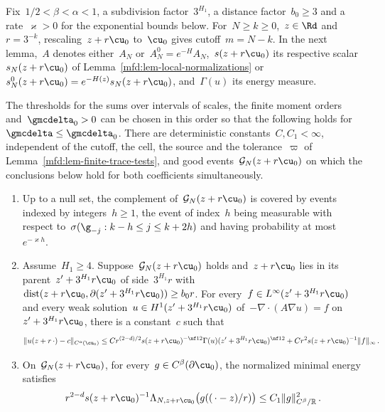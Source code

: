 \documentclass[11pt]{amsart}
\begin{document}
Fix~$1/2<\beta<\alpha<1$, a subdivision factor~$3^{H_1}$, a distance factor~$b_0\geq3$ and a rate~$\varkappa>0$ for the exponential bounds below. For~$N\geq k\geq0$,~$z\in\Rd$ and~$r=3^{-k}$, rescaling~$z+r\cu_0$ to~$\cu_0$ gives cutoff~$m=N-k$. In the next lemma,~$A$ denotes either~$A_N$ or~$A_N^0=e^{-H}A_N$,~$s(z+r\cu_0)$ its respective scalar~$s_N(z+r\cu_0)$ of Lemma~\ref{mfd:lem-local-normalizations} or~$s_N^0(z+r\cu_0)=e^{-H(z)}s_N(z+r\cu_0)$, and~$\Gamma(u)$ its energy measure.

\begin{lemma}
\label{mfd:lem-finite-good-cell}
The thresholds for the sums over intervals of scales, the finite moment orders and~$\gmcdelta_0>0$ can be chosen in this order so that the following holds for~$\gmcdelta\leq\gmcdelta_0$. There are deterministic constants~$C,C_1<\infty$, independent of the cutoff, the cell, the source and the tolerance~$\varpi$ of Lemma~\ref{mfd:lem-finite-trace-tests}, and good events~$\mathcal G_N(z+r\cu_0)$ on which the conclusions below hold for both coefficients simultaneously.
\begin{enumerate}[label=(\roman*),leftmargin=*]
\item Up to a null set, the complement of~$\mathcal G_N(z+r\cu_0)$ is covered by events indexed by integers~$h\geq1$, the event of index~$h$ being measurable with respect to~$\sigma(\g_{-j}:k-h\leq j\leq k+2h)$ and having probability at most~$e^{-\varkappa h}$.
\item Assume~$H_1\geq4$. Suppose~$\mathcal G_N(z+r\cu_0)$ holds and~$z+r\cu_0$ lies in its parent~$z'+3^{H_1}r\cu_0$ of side~$3^{H_1}r$ with~$\operatorname{dist}(z+r\cu_0,\partial(z'+3^{H_1}r\cu_0))\geq b_0r$. For every~$f\in L^\infty(z'+3^{H_1}r\cu_0)$ and every weak solution~$u\in H^1(z'+3^{H_1}r\cu_0)$ of~$-\nabla\cdot(A\nabla u)=f$ on~$z'+3^{H_1}r\cu_0$, there is a constant~$c$ such that
\begin{equation}
	\|u(z+r\,\cdot)-c\|_{C^\alpha(\cu_0)}
	\leq C r^{(2-d)/2}s(z+r\cu_0)^{-\nf12}\Gamma(u)(z'+3^{H_1}r\cu_0)^{\nf12}
	+Cr^2s(z+r\cu_0)^{-1}\|f\|_\infty\,.
	\label{eq:mfd-finite-good-holder}
\end{equation}
\item On~$\mathcal G_N(z+r\cu_0)$, for every~$g\in C^\beta(\partial \cu_0)$, the normalized minimal energy satisfies
\begin{equation*}
	r^{2-d}s(z+r\cu_0)^{-1}\Lambda_{N,z+r\cu_0}\bigl(g((\,\cdot-z)/r)\bigr)
	\leq C_1\|g\|_{C^\beta/\mathbb R}^2\,.
\end{equation*}
\end{enumerate}
\end{lemma}
\end{document}
